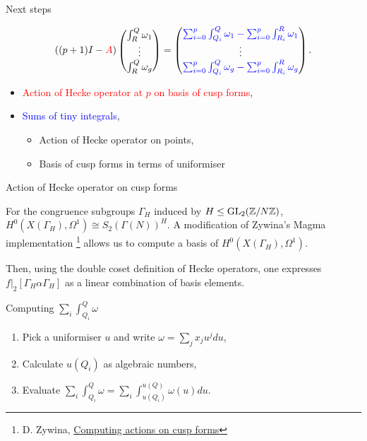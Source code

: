 \begin{frame}{Next steps}

\begin{equation*}
   ((p+1)I-\textcolor{red}{A})\begin{pmatrix} \int^Q_R\omega_1 \\\vdots \\ \int^Q_R\omega_g \end{pmatrix} =  \begin{pmatrix} \textcolor{blue}{\sum_{i=0}^{p}\int^Q_{Q_i} \omega_1 - \sum_{i=0}^{p}\int^R_{R_i} \omega_1} \\\vdots \\ \textcolor{blue}{\sum_{i=0}^{p}\int^Q_{Q_i} \omega_g - \sum_{i=0}^{p}\int^R_{R_i} \omega_g} \end{pmatrix}.
\end{equation*}

\begin{itemize}
\item \textcolor{red}{Action of Hecke operator at $p$ on basis of cusp forms},
\item \textcolor{blue}{Sums of tiny integrals},
\begin{itemize}
\item Action of Hecke operator on points,
\item Basis of cusp forms in terms of uniformiser
\end{itemize}
\end{itemize}

\end{frame}

\begin{frame}{Action of Hecke operator on cusp forms}

For the congruence subgroups $\Gamma_H$ induced by $H \leq \operatorname{GL}_2(\mathbb{Z}/N\mathbb{Z})$, $H^0(X(\Gamma_H),\Omega^1) \cong S_2(\Gamma(N))^H$. A modification of Zywina's Magma implementation \footnote{D. Zywina, \href{https://arxiv.org/abs/2001.07270}{Computing actions on cusp forms}} allows us to compute a basis of $H^0(X(\Gamma_H),\Omega^1)$.

Then, using the double coset definition of Hecke operators, one expresses $f|_2 [\Gamma_H \alpha \Gamma_H]$ as a linear combination of basis elements.
\end{frame}

\begin{frame}{Computing $\sum_i \int_{Q_i}^Q \omega $}
\begin{enumerate}
\item Pick a uniformiser $u$ and write $\omega = \sum_j x_j u^j du$,
\item Calculate $u(Q_i)$ as algebraic numbers,
\item Evaluate $\sum_i \int_{Q_i}^Q \omega = \sum_i \int_{u(Q_i)}^{u(Q)} \omega(u) du$.
\end{enumerate}
\end{frame}


